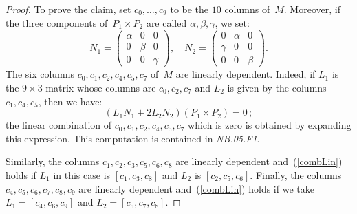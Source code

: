 \documentclass[a4paper, 11pt, reqno]{amsart}
\theoremstyle{plain}
\theoremstyle{definition}
\newcommand{\nb}[2]{\textsl{{NB}.{#1}.{#2}}}
\begin{document}
\begin{proof}
To prove the claim, set $c_0, \dots, c_9$ to be the $10$ columns of~$M$.
Moreover,
if the three components of~$P_1 \times P_2$ are called $\alpha, \beta, \gamma$, we set:
%
\[
  N_1 = \left(
  \begin{array}{ccc}
    \alpha & 0 & 0 \\
    0 & \beta & 0\\
    0 & 0 & \gamma
  \end{array}
  \right), \quad
  N_2 = \left(
  \begin{array}{ccc}
    0 & \alpha & 0 \\
    \gamma & 0 & 0\\
    0 & 0 & \beta
  \end{array}
  \right).
\]
%
The six
columns $c_0, c_1, c_2, c_4, c_5, c_7$ of~$M$ are linearly dependent. Indeed, if $L_1$ is the $9\times 3$ matrix whose columns are
$c_0, c_2, c_7$ and $L_2$ is given by the columns $c_1, c_4, c_5$,
then we have:
%
\begin{equation}
  (L_1 N_1 + 2 L_2N_2) (P_1 \times P_2) = 0 \,;
  \label{combLin}
\end{equation}
%
the linear combination of $c_0, c_1, c_2, c_4, c_5, c_7$ which is zero
is obtained by expanding this expression. This computation is contained in \nb{05}{F1}.

Similarly, the columns $c_1, c_2, c_3, c_5, c_6, c_8$ are linearly dependent
and~(\ref{combLin}) holds if $L_1$ in this case is $[c_1, c_3, c_8]$ and
$L_2$ is $[c_2, c_5, c_6]$. Finally, the columns
$c_4, c_5, c_6, c_7, c_8, c_9$ are linearly dependent and~(\ref{combLin})
holds if we take $L_1 = [c_4, c_6, c_9]$ and $L_2 = [c_5, c_7, c_8]$.


\end{proof}
\end{document}
